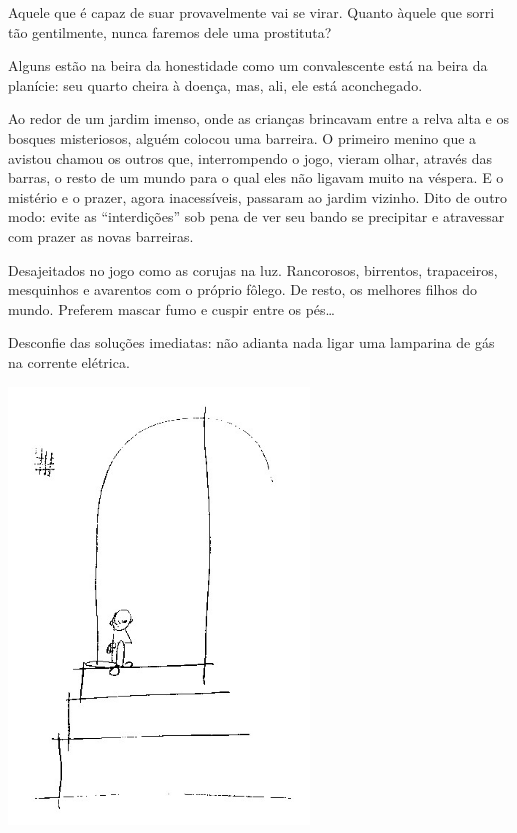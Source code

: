 \bigskip
\bigskip

Aquele que é capaz de suar provavelmente vai se virar. Quanto àquele que
sorri tão gentilmente, nunca faremos dele uma prostituta?

\bigskip
\bigskip

Alguns estão na beira da honestidade como um convalescente está na beira
da planície: seu quarto cheira à doença, mas, ali, ele está aconchegado.

\bigskip
\bigskip

Ao redor de um jardim imenso, onde as crianças brincavam entre a relva
alta e os bosques misteriosos, alguém colocou uma barreira. O primeiro
menino que a avistou chamou os outros que, interrompendo o jogo, vieram
olhar, através das barras, o resto de um mundo para o qual eles não
ligavam muito na véspera. E o mistério e o prazer, agora inacessíveis,
passaram ao jardim vizinho. Dito de outro modo: evite as ``interdições''
sob pena de ver seu bando se precipitar e atravessar com prazer as novas
barreiras.

\bigskip
\bigskip

Desajeitados no jogo como as corujas na luz. Rancorosos, birrentos,
trapaceiros, mesquinhos e avarentos com o próprio fôlego. De resto, os
melhores filhos do mundo. Preferem mascar fumo e cuspir entre os pés\ldots{}

\bigskip
\bigskip

Desconfie das soluções imediatas: não adianta nada ligar uma lamparina
de gás na corrente elétrica.

\bigskip
\bigskip

\begin{center}
\includegraphics[width=80mm]{./imgs/Image_11.jpg}
\end{center}

